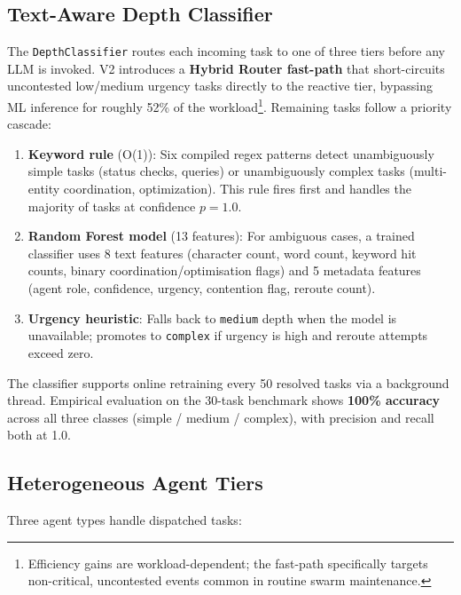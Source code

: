 \documentclass[conference]{IEEEtran}
\begin{document}
\subsection{Text-Aware Depth Classifier}

The \texttt{DepthClassifier} routes each incoming task to one of three tiers before any
LLM is invoked. V2 introduces a \textbf{Hybrid Router fast-path} that short-circuits
uncontested low/medium urgency tasks directly to the reactive tier, bypassing ML inference
for roughly 52\% of the workload\footnote{Efficiency gains are workload-dependent; the fast-path specifically targets non-critical, uncontested events common in routine swarm maintenance.}. Remaining tasks follow a priority cascade:

\begin{enumerate}
\item \textbf{Keyword rule} (O(1)): Six compiled regex patterns detect unambiguously
      simple tasks (status checks, queries) or unambiguously complex tasks (multi-entity
      coordination, optimization). This rule fires first and handles the majority of tasks
      at confidence $p=1.0$.
\item \textbf{Random Forest model} (13 features): For ambiguous cases, a trained
      classifier uses 8 text features (character count, word count, keyword hit counts,
      binary coordination/optimisation flags) and 5 metadata features (agent role,
      confidence, urgency, contention flag, reroute count).
\item \textbf{Urgency heuristic}: Falls back to \texttt{medium} depth when the model is
      unavailable; promotes to \texttt{complex} if urgency is high and reroute attempts
      exceed zero.
\end{enumerate}

The classifier supports online retraining every 50 resolved tasks via a background thread.
Empirical evaluation on the 30-task benchmark shows \textbf{100\% accuracy} across all
three classes (simple / medium / complex), with precision and recall both at 1.0.

\subsection{Heterogeneous Agent Tiers}

Three agent types handle dispatched tasks:
\end{document}
